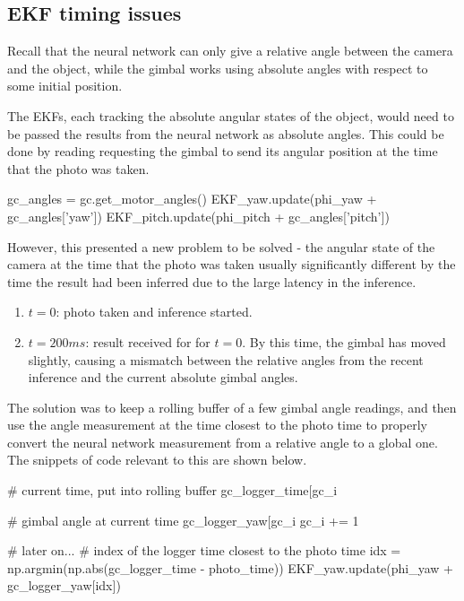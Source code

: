 \subsection{EKF timing issues}
Recall that the neural network can only give a relative angle between the camera and the object, while the gimbal works using absolute angles with respect to some initial position.

The EKFs, each tracking the absolute angular states of the object, would need to be passed the results from the neural network as absolute angles. This could be done by reading requesting the gimbal to send its angular position at the time that the photo was taken. \\

\begin{python}
gc_angles = gc.get_motor_angles()
EKF_yaw.update(phi_yaw + gc_angles['yaw'])
EKF_pitch.update(phi_pitch + gc_angles['pitch'])
\end{python}

However, this presented a new problem to be solved - the angular state of the camera at the time that the photo was taken usually significantly different by the time the result had been inferred due to the large latency in the inference.

\begin{enumerate}
\item $t = 0$: photo taken and inference started.
\item $t = 200ms$: result received for for $t=0$. By this time, the gimbal has moved slightly, causing a mismatch between the relative angles from the recent inference and the current absolute gimbal angles.
\end{enumerate}

The solution was to keep a rolling buffer of a few gimbal angle readings, and then use the angle measurement at the time closest to the photo time to properly convert the neural network measurement from a relative angle to a global one. The snippets of code relevant to this are shown below. \\

\begin{python}
# current time, put into rolling buffer
gc_logger_time[gc_i %

# gimbal angle at current time
gc_logger_yaw[gc_i %
gc_i += 1

# later on...
# index of the logger time closest to the photo time
idx = np.argmin(np.abs(gc_logger_time - photo_time))
EKF_yaw.update(phi_yaw + gc_logger_yaw[idx])
\end{python}

